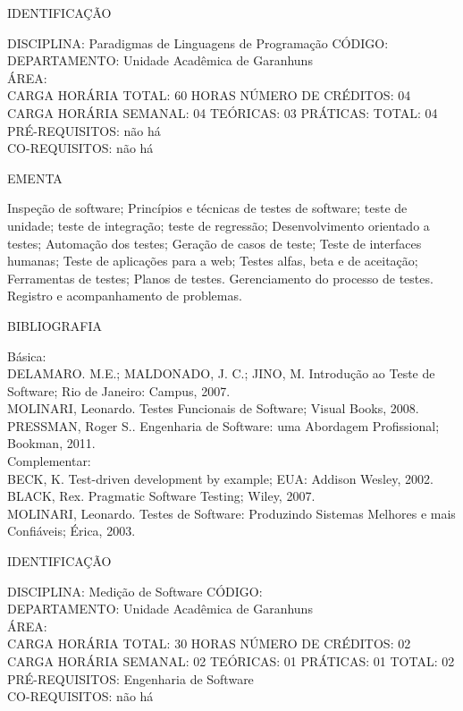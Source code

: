 \documentclass[
	12pt,				%
	openright,			%
  oneside,     %
	a4paper,			%
	chapter=TITLE,		%
	english,			%
	french,				%
	spanish,			%
	brazil				%
	]{abntex2}
\begin{document}
\begin{apendicesenv}
\newpage IDENTIFICAÇÃO

DISCIPLINA: Paradigmas de Linguagens de Programação CÓDIGO:\\ 
DEPARTAMENTO: Unidade Acadêmica de Garanhuns\\
ÁREA: \\
CARGA HORÁRIA TOTAL: 60 HORAS NÚMERO DE CRÉDITOS: 04\\
CARGA HORÁRIA SEMANAL: 04 TEÓRICAS: 03 PRÁTICAS: TOTAL: 04 \\
PRÉ-REQUISITOS: não há\\
CO-REQUISITOS: não há

EMENTA 

Inspeção de software; Princípios e técnicas de testes de software; teste
de unidade; teste de integração; teste de regressão; Desenvolvimento
orientado a testes; Automação dos testes; Geração de casos de teste;
Teste de interfaces humanas; Teste de aplicações para a web; Testes
alfas, beta e de aceitação; Ferramentas de testes; Planos de testes.
Gerenciamento do processo de testes. Registro e acompanhamento de
problemas.

BIBLIOGRAFIA 

Básica:\\
DELAMARO. M.E.; MALDONADO, J. C.; JINO, M. Introdução ao Teste de
Software; Rio de Janeiro: Campus, 2007.\\
MOLINARI, Leonardo. Testes Funcionais de Software; Visual Books, 2008.\\
PRESSMAN, Roger S.. Engenharia de Software: uma Abordagem Profissional;
Bookman, 2011.\\
Complementar:\\
BECK, K. Test-driven development by example; EUA: Addison Wesley, 2002.\\
BLACK, Rex. Pragmatic Software Testing; Wiley, 2007.\\
MOLINARI, Leonardo. Testes de Software: Produzindo Sistemas Melhores e
mais Confiáveis; Érica, 2003.

\newpage IDENTIFICAÇÃO

DISCIPLINA: Medição de Software CÓDIGO:\\ 
DEPARTAMENTO: Unidade Acadêmica de Garanhuns\\
ÁREA: \\
CARGA HORÁRIA TOTAL: 30 HORAS NÚMERO DE CRÉDITOS: 02\\
CARGA HORÁRIA SEMANAL: 02 TEÓRICAS: 01 PRÁTICAS: 01 TOTAL: 02\\
PRÉ-REQUISITOS: Engenharia de Software\\
CO-REQUISITOS: não há


\end{apendicesenv}
\end{document}
